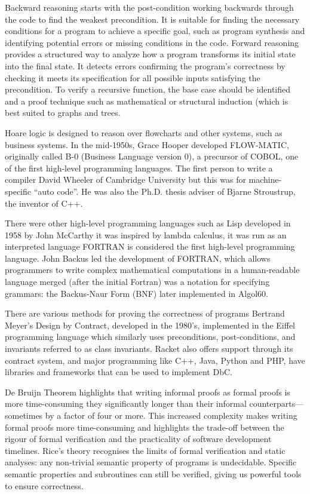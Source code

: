 \documentclass{article}
\begin{document}
Backward reasoning starts with the post-condition working backwards through the code to find the weakest precondition. It is suitable for finding the necessary conditions for a program to achieve a specific goal, such as program synthesis and identifying potential errors or missing conditions in the code.  Forward reasoning provides a structured way to analyze how a program transforms its initial state into the final state.  It detects errors confirming the program's correctness by checking it meets its specification for all possible inputs satisfying the precondition. To verify a recursive function, the base case should be identified and a proof technique such as mathematical or structural induction (which is best suited to graphs and trees.

Hoare logic is designed to reason over flowcharts and  other systems, such as business systems. In the mid-1950s, Grace Hooper developed FLOW-MATIC, originally called B-0 (Business Language version 0), a precursor of COBOL, one of the first high-level programming languages. The first person to write a compiler David Wheeler of Cambridge University but this was for machine-specific “auto code”. He was also the Ph.D. thesis adviser of Bjarne Stroustrup, the inventor of C++. 

There were other high-level programming languages such as Lisp developed in 1958 by John McCarthy it was inspired by lambda calculus, it was run as an interpreted language FORTRAN is considered the first high-level programming language. John Backus led the development of FORTRAN, which allows programmers to write complex mathematical computations in a human-readable language merged (after the initial Fortran) was a notation for specifying grammars: the Backus-Naur Form (BNF) later implemented in  Algol60. 

There are various methods for proving the correctness of programs Bertrand Meyer’s Design by Contract, developed in the 1980's, implemented in the Eiffel programming language which similarly uses preconditions, post-conditions, and invariants referred to as class invariants.  Racket also offers support  through its contract system,  and major programming like C++,  Java, Python and PHP, have libraries and frameworks that can be used to implement DbC.

De Bruijn Theorem highlights that writing informal proofs as formal proofs is more time-consuming they significantly longer than their informal counterparts—sometimes by a factor of four or more. This increased complexity makes writing formal proofs more time-consuming and highlights the trade-off between the rigour of formal verification and the practicality of software development timelines.  Rice's theory recognises the limits of formal verification and static analyses: any non-trivial semantic property of programs is undecidable.  Specific semantic properties and subroutines can still be verified, giving us powerful tools to ensure correctness. 
\end{document}
